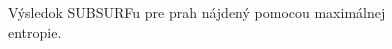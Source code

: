 \documentclass[a4paper,12pt,twoside]{article}%
\begin{document}
\begin{figure}[H]
    \hspace{5px}
    \hspace{5px}
    \caption{Výsledok SUBSURFu pre prah nájdený pomocou maximálnej entropie.}
    \label{fig:kapur_res}
\end{figure}
\end{document}
